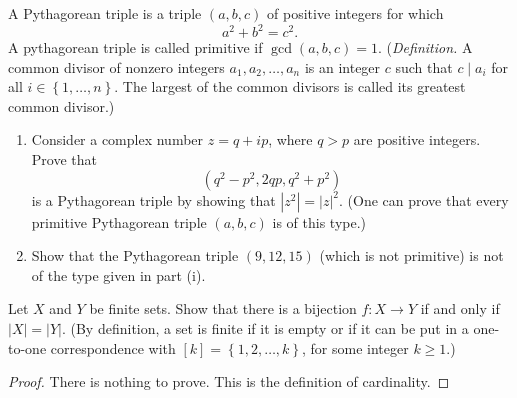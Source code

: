 \begin{questions}
\question
     A Pythagorean triple is a triple \((a, b, c)\) of positive integers for which
\[
a^2+b^2=c^2.
\] A pythagorean triple is  called primitive if  \(\operatorname{gcd}(a, b, c)=1\). (\textit{Definition.} A common divisor of nonzero integers \(a_1, a_2, \ldots, a_n\) is an integer \(c\) such that \(c \mid a_i\) for all \(i\in \left\{ 1,\dots,n \right\}\). The largest of the common divisors   is called its greatest common divisor.)
\begin{enumerate}[label=(\alph*)]
    \item Consider a complex number \(z=q+i p\), where \(q>p\) are positive integers. Prove that
\[
\left(q^2-p^2, 2 q p, q^2+p^2\right)
\]
is a Pythagorean triple by showing that \(\left|z^2\right|=|z|^2\). (One can prove that every primitive Pythagorean triple \((a, b, c)\) is of this type.)
\item Show that the Pythagorean triple \((9,12,15)\) (which is not primitive) is not of the type given in part (i).

\end{enumerate}


\begin{solution}
    
\end{solution}


\question
    Let \(X\) and \(Y\) be finite sets. Show that there is a bijection \(f\colon X \rightarrow Y\) if and only if \(|X|=|Y|\). (By definition, a set is finite if it is empty or if it can be put in a one-to-one correspondence with \([k] = \left\{ 1,2,\ldots, k \right\}\), for some integer \(k\geq 1\).)

\begin{proof} There is nothing to prove. This is the definition of cardinality. 
\end{proof}



\end{questions}
